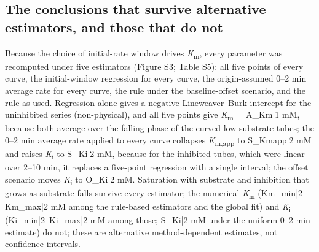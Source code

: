 \documentclass[9pt,twocolumn]{extarticle}
\newcommand{\Km}{\textit{K}\textsubscript{m}}
\newcommand{\Kmapp}{\textit{K}\textsubscript{m,app}}
\newcommand{\Ki}{\textit{K}\textsubscript{i}}
\newcommand{\dash}{–}
\begin{document}
\subsection{The conclusions that survive alternative estimators, and those that do not}
Because the choice of initial-rate window drives \Km, every parameter was recomputed under five estimators (Figure S3; Table S5): all five points of every curve, the initial-window regression for every curve, the origin-assumed 0\dash 2 min average rate for every curve, the rule under the baseline-offset scenario, and the rule as used. Regression alone gives a negative Lineweaver\dash Burk intercept for the uninhibited series (non-physical), and all five points give \Km{} = {{A_Km|1}} mM, because both average over the falling phase of the curved low-substrate tubes; the 0\dash 2 min average rate applied to every curve collapses \Kmapp{} to {{S_Kmapp|2}} mM and raises \Ki{} to {{S_Ki|2}} mM, because for the inhibited tubes, which were linear over 2\dash 10 min, it replaces a five-point regression with a single interval; the offset scenario moves \Ki{} to {{O_Ki|2}} mM. Saturation with substrate and inhibition that grows as substrate falls survive every estimator; the numerical \Km{} ({{Km_min|2}}\dash{{Km_max|2}} mM among the rule-based estimators and the global fit) and \Ki{} ({{Ki_min|2}}\dash{{Ki_max|2}} mM among those; {{S_Ki|2}} mM under the uniform 0\dash 2 min estimate) do not; these are alternative method-dependent estimates, not confidence intervals.
\end{document}
